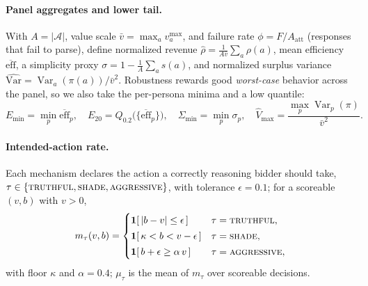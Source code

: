 \documentclass[12pt]{article}
\begin{document}
\paragraph{Panel aggregates and lower tail.} With $A=|\mathcal{A}|$, value scale
$\bar v=\max_a v^{\max}_a$, and failure rate $\phi=F/A_{\text{att}}$ (responses that
fail to parse), define normalized revenue $\hat\rho=\frac1{A\bar v}\sum_a\rho(a)$,
mean efficiency $\overline{\mathrm{eff}}$, a simplicity proxy
$\sigma=1-\frac1A\sum_a s(a)$, and normalized surplus variance
$\widehat{\mathrm{Var}}=\operatorname{Var}_a(\pi(a))/\bar v^2$. Robustness rewards
good \emph{worst-case} behavior across the panel, so we also take the per-persona
minima and a low quantile:
\begin{equation}
E_{\min}=\min_p \overline{\mathrm{eff}}_p,\quad
E_{20}=Q_{0.2}\!\big(\{\overline{\mathrm{eff}}_p\}\big),\quad
\Sigma_{\min}=\min_p \sigma_p,\quad
\widehat V_{\max}=\frac{\max_p \operatorname{Var}_p(\pi)}{\bar v^{2}}.
\label{eq:tail}
\end{equation}

\paragraph{Intended-action rate.} Each mechanism declares the action a correctly
reasoning bidder should take, $\tau\in\{\textsc{truthful},\textsc{shade},
\textsc{aggressive}\}$, with tolerance $\epsilon=0.1$; for a scoreable $(v,b)$ with
$v>0$,
\begin{equation}
m_\tau(v,b)=
\begin{cases}
\mathbf{1}\!\left[\,|b-v|\le \epsilon\,\right] & \tau=\textsc{truthful},\\[2pt]
\mathbf{1}\!\left[\,\kappa < b < v-\epsilon\,\right] & \tau=\textsc{shade},\\[2pt]
\mathbf{1}\!\left[\,b+\epsilon \ge \alpha\, v\,\right] & \tau=\textsc{aggressive},
\end{cases}
\label{eq:match}
\end{equation}
with floor $\kappa$ and $\alpha=0.4$; $\mu_\tau$ is the mean of $m_\tau$ over
scoreable decisions.
\end{document}

